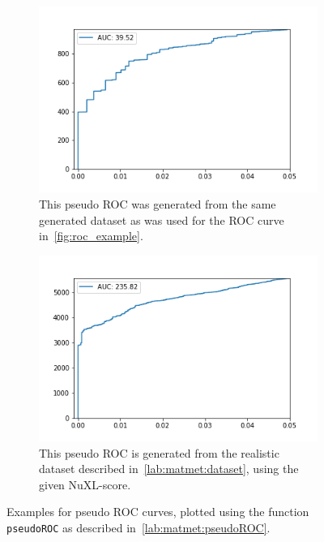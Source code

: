 	\begin{figure}
		\normalsize
		\centering
		\begin{subfigure}{0.49\textwidth}
			\includegraphics[width = \textwidth]{figures/pseudo_ROC_generated_dataset.png}
			\caption{This pseudo ROC was generated from the same generated dataset as was used for the ROC curve in~\ref{fig:roc_example}.}
		\end{subfigure}
		\hfill
		\begin{subfigure}{0.49\textwidth}
			\includegraphics[width = \textwidth]{figures/pseudo_ROC_slow.png}
			\caption{This pseudo ROC is generated from the realistic dataset described in~\ref{lab:matmet:dataset}, using the given NuXL-score.}
		\end{subfigure}
		\caption[Examples for pseudo ROC curves]{Examples for pseudo ROC curves, plotted using the function \texttt{pseudoROC} as described in~\ref{lab:matmet:pseudoROC}.}
		\label{fig:pseudo_roc_example}
	\end{figure}
	\renewcommand{\baselinestretch}{1}